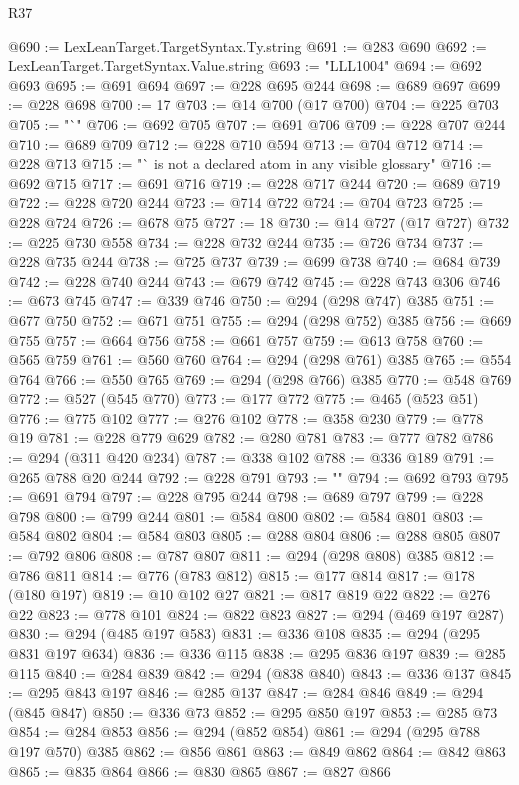 \begin{lexlean}{R37}
\begin{coremodule}
@690 := LexLeanTarget.TargetSyntax.Ty.string
@691 := @283 @690
@692 := LexLeanTarget.TargetSyntax.Value.string
@693 := "LLL1004"
@694 := @692 @693
@695 := @691 @694
@697 := @228 @695 @244
@698 := @689 @697
@699 := @228 @698
@700 := 17
@703 := @14 @700 (@17 @700)
@704 := @225 @703
@705 := "`"
@706 := @692 @705
@707 := @691 @706
@709 := @228 @707 @244
@710 := @689 @709
@712 := @228 @710 @594
@713 := @704 @712
@714 := @228 @713
@715 := "` is not a declared atom in any visible glossary"
@716 := @692 @715
@717 := @691 @716
@719 := @228 @717 @244
@720 := @689 @719
@722 := @228 @720 @244
@723 := @714 @722
@724 := @704 @723
@725 := @228 @724
@726 := @678 @75
@727 := 18
@730 := @14 @727 (@17 @727)
@732 := @225 @730 @558
@734 := @228 @732 @244
@735 := @726 @734
@737 := @228 @735 @244
@738 := @725 @737
@739 := @699 @738
@740 := @684 @739
@742 := @228 @740 @244
@743 := @679 @742
@745 := @228 @743 @306
@746 := @673 @745
@747 := @339 @746
@750 := @294 (@298 @747) @385
@751 := @677 @750
@752 := @671 @751
@755 := @294 (@298 @752) @385
@756 := @669 @755
@757 := @664 @756
@758 := @661 @757
@759 := @613 @758
@760 := @565 @759
@761 := @560 @760
@764 := @294 (@298 @761) @385
@765 := @554 @764
@766 := @550 @765
@769 := @294 (@298 @766) @385
@770 := @548 @769
@772 := @527 (@545 @770)
@773 := @177 @772
@775 := @465 (@523 @51)
@776 := @775 @102
@777 := @276 @102
@778 := @358 @230
@779 := @778 @19
@781 := @228 @779 @629
@782 := @280 @781
@783 := @777 @782
@786 := @294 (@311 @420 @234)
@787 := @338 @102
@788 := @336 @189
@791 := @265 @788 @20 @244
@792 := @228 @791
@793 := ""
@794 := @692 @793
@795 := @691 @794
@797 := @228 @795 @244
@798 := @689 @797
@799 := @228 @798
@800 := @799 @244
@801 := @584 @800
@802 := @584 @801
@803 := @584 @802
@804 := @584 @803
@805 := @288 @804
@806 := @288 @805
@807 := @792 @806
@808 := @787 @807
@811 := @294 (@298 @808) @385
@812 := @786 @811
@814 := @776 (@783 @812)
@815 := @177 @814
@817 := @178 (@180 @197)
@819 := @10 @102 @27
@821 := @817 @819 @22
@822 := @276 @22
@823 := @778 @101
@824 := @822 @823
@827 := @294 (@469 @197 @287)
@830 := @294 (@485 @197 @583)
@831 := @336 @108
@835 := @294 (@295 @831 @197 @634)
@836 := @336 @115
@838 := @295 @836 @197
@839 := @285 @115
@840 := @284 @839
@842 := @294 (@838 @840)
@843 := @336 @137
@845 := @295 @843 @197
@846 := @285 @137
@847 := @284 @846
@849 := @294 (@845 @847)
@850 := @336 @73
@852 := @295 @850 @197
@853 := @285 @73
@854 := @284 @853
@856 := @294 (@852 @854)
@861 := @294 (@295 @788 @197 @570) @385
@862 := @856 @861
@863 := @849 @862
@864 := @842 @863
@865 := @835 @864
@866 := @830 @865
@867 := @827 @866

\end{coremodule}
\end{lexlean}
